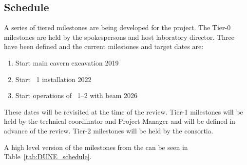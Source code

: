 \subsection{Schedule}
\label{sec:fdsp-coord-controls}

A series of tiered milestones are being developed for the 
project. The Tier-0 milestones are held by the spokespersons and host
laboratory director. Three have been defined and the current milestones and
target dates are:
\begin{enumerate}
\item Start main cavern excavation \hspace{2.1in} 2019
\item Start ~1 installation \hspace{2.1in} 2022
\item Start operations of ~1--2 with beam \hspace{1in} 2026
\end{enumerate}
These dates will be revisited at the time of the  review.  Tier-1
milestones will be held by the technical coordinator and  Project
Manager and will be defined in advance of the  review. Tier-2
milestones will be held by the consortia.

A high level version of the  milestones from the 
can be seen in Table~\ref{tab:DUNE_schedule}. %

